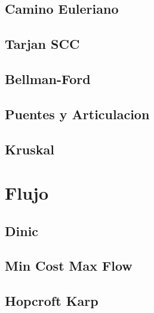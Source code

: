\documentclass[a4paper,11pt,landscape,twocolumn]{article}
\begin{document}


\subsection{Camino Euleriano}



\subsection{Tarjan SCC}



\subsection{Bellman-Ford}



\subsection{Puentes y Articulacion}



\subsection{Kruskal}



\section{Flujo}

\subsection{Dinic}



\subsection{Min Cost Max Flow}



\subsection{Hopcroft Karp}
\end{document}
